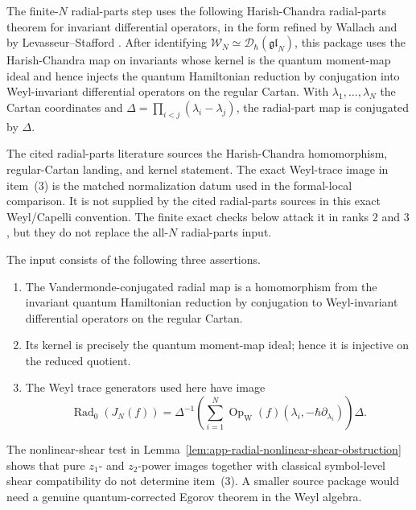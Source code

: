 \begin{stmt}
\label{stmt:app-radial-external-input}
  The finite-\(N\) radial-parts step uses the following
  Harish-Chandra radial-parts theorem for invariant differential
  operators, in the form refined by Wallach and by
  Levasseur--Stafford
  \cites{harish-chandra-invariant-differential-operators,
  wallach-reductive-invariant-differential,
  levasseur-stafford-harish-chandra,
  levasseur-stafford-kernel-harish-chandra}.  After identifying
  \(\mathcal W_N\simeq\mathcal D_\hbar(\mathfrak{gl}_N)\), this package
  uses the Harish-Chandra map on invariants whose kernel is the quantum
  moment-map ideal and hence injects the quantum Hamiltonian reduction
  by conjugation into Weyl-invariant differential operators on the
  regular Cartan.  With
  \(\lambda_1,\ldots,\lambda_N\) the Cartan coordinates and
  \(\Delta=\prod_{i<j}(\lambda_i-\lambda_j)\), the radial-part map is
  conjugated by \(\Delta\).

  The cited radial-parts literature sources the Harish-Chandra
  homomorphism, regular-Cartan landing, and kernel statement.  The
  exact Weyl-trace image in item~(3) is the matched normalization datum
  used in the formal-local comparison.  It is not supplied by the cited radial-parts
  sources in this exact Weyl/Capelli convention.  The finite exact checks
  below attack it in ranks \(2\) and \(3\), but they do not replace the
  all-\(N\) radial-parts input.

  The input consists of the following three assertions.
  \begin{enumerate}
    \item The Vandermonde-conjugated radial map is a homomorphism from
      the invariant quantum Hamiltonian reduction by conjugation to
      Weyl-invariant differential operators on the regular Cartan.
    \item Its kernel is precisely the quantum moment-map ideal; hence it
      is injective on the reduced quotient.
    \item The Weyl trace generators used here have image
  \[
    \operatorname{Rad}_0(J_N(f))
      =\Delta^{-1}\left(\sum_{i=1}^N
        \operatorname{Op}_{\mathrm W}
        (f)(\lambda_i,-\hbar\partial_{\lambda_i})\right)\Delta.
  \]
  \end{enumerate}
  The nonlinear-shear test in
  Lemma~\ref{lem:app-radial-nonlinear-shear-obstruction} shows that
  pure \(z_1\)- and \(z_2\)-power images together with classical
  symbol-level shear compatibility do not determine item~(3).  A smaller
  source package would need a genuine quantum-corrected Egorov theorem in
  the Weyl algebra.
\end{stmt}

